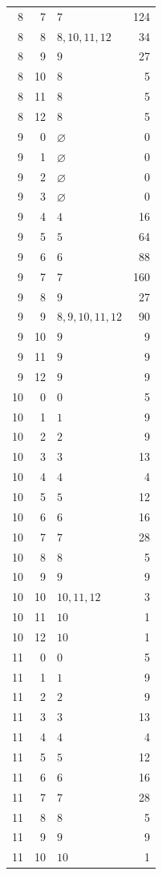 \begin{longtable}{rrlr}
8 & 7 & $7$ & 124\\
8 & 8 & $8,10,11,12$ & 34\\
8 & 9 & $9$ & 27\\
8 & 10 & $8$ & 5\\
8 & 11 & $8$ & 5\\
8 & 12 & $8$ & 5\\
9 & 0 & $\varnothing$ & 0\\
9 & 1 & $\varnothing$ & 0\\
9 & 2 & $\varnothing$ & 0\\
9 & 3 & $\varnothing$ & 0\\
9 & 4 & $4$ & 16\\
9 & 5 & $5$ & 64\\
9 & 6 & $6$ & 88\\
9 & 7 & $7$ & 160\\
9 & 8 & $9$ & 27\\
9 & 9 & $8,9,10,11,12$ & 90\\
9 & 10 & $9$ & 9\\
9 & 11 & $9$ & 9\\
9 & 12 & $9$ & 9\\
10 & 0 & $0$ & 5\\
10 & 1 & $1$ & 9\\
10 & 2 & $2$ & 9\\
10 & 3 & $3$ & 13\\
10 & 4 & $4$ & 4\\
10 & 5 & $5$ & 12\\
10 & 6 & $6$ & 16\\
10 & 7 & $7$ & 28\\
10 & 8 & $8$ & 5\\
10 & 9 & $9$ & 9\\
10 & 10 & $10,11,12$ & 3\\
10 & 11 & $10$ & 1\\
10 & 12 & $10$ & 1\\
11 & 0 & $0$ & 5\\
11 & 1 & $1$ & 9\\
11 & 2 & $2$ & 9\\
11 & 3 & $3$ & 13\\
11 & 4 & $4$ & 4\\
11 & 5 & $5$ & 12\\
11 & 6 & $6$ & 16\\
11 & 7 & $7$ & 28\\
11 & 8 & $8$ & 5\\
11 & 9 & $9$ & 9\\
11 & 10 & $10$ & 1\\

\end{longtable}
